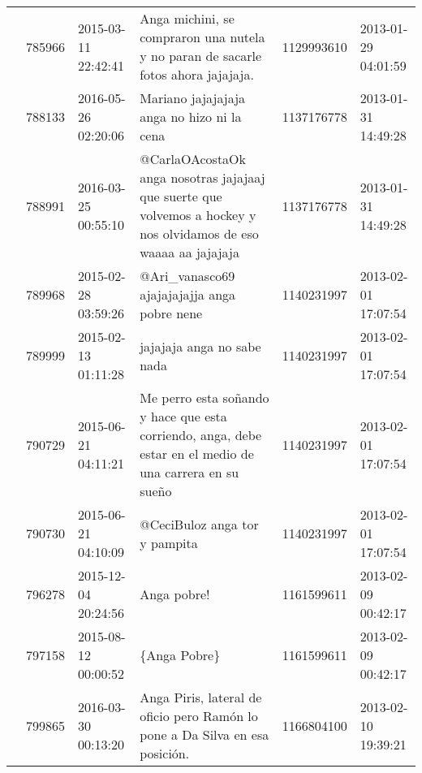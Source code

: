 \begin{tabular}{llllrl}
           & 785966  & 2015-03-11 22:42:41 &                                                            Anga michini, se compraron una nutela y no paran de sacarle fotos ahora jajajaja. &  1129993610 & 2013-01-29 04:01:59 \\
           & 788133  & 2016-05-26 02:20:06 &                                                                                                   Mariano jajajajaja anga no hizo ni la cena &  1137176778 & 2013-01-31 14:49:28 \\
           & 788991  & 2016-03-25 00:55:10 &                             @CarlaOAcostaOk anga nosotras jajajaaj que suerte que volvemos a hockey y nos olvidamos de eso waaaa aa jajajaja &  1137176778 & 2013-01-31 14:49:28 \\
           & 789968  & 2015-02-28 03:59:26 &                                                                                                  @Ari\_vanasco69 ajajajajajja anga pobre nene &  1140231997 & 2013-02-01 17:07:54 \\
           & 789999  & 2015-02-13 01:11:28 &                                                                                                                   jajajaja anga no sabe nada &  1140231997 & 2013-02-01 17:07:54 \\
           & 790729  & 2015-06-21 04:11:21 &                                     Me perro esta soñando y hace que esta corriendo, anga, debe estar en el medio de una carrera en su sueño &  1140231997 & 2013-02-01 17:07:54 \\
           & 790730  & 2015-06-21 04:10:09 &                                                                                                                @CeciBuloz anga tor y pampita &  1140231997 & 2013-02-01 17:07:54 \\
           & 796278  & 2015-12-04 20:24:56 &                                                                                                                                  Anga pobre! &  1161599611 & 2013-02-09 00:42:17 \\
           & 797158  & 2015-08-12 00:00:52 &                                                                                                                                 \{Anga Pobre\} &  1161599611 & 2013-02-09 00:42:17 \\
           & 799865  & 2016-03-30 00:13:20 &                                                                 Anga Piris, lateral de oficio pero Ramón lo pone a Da Silva en esa posición. &  1166804100 & 2013-02-10 19:39:21 \\

\end{tabular}
